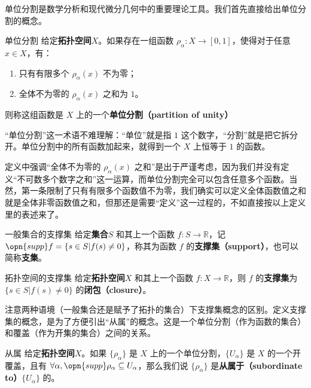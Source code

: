 

单位分割是数学分析和现代微分几何中的重要理论工具。我们首先直接给出单位分割的概念。

\begin{definition}{单位分割}
给定\textbf{拓扑空间}$X$。如果存在一组函数 $\rho_\alpha: X \to [0, 1]$，使得对于任意 $x\in X$，有：
\begin{enumerate}
\item 只有有限多个 $\rho_\alpha(x)$ 不为零；
\item 全体不为零的 $\rho_\alpha(x)$ 之和为 $1$。
\end{enumerate}
则称这组函数是 $X$ 上的一个\textbf{单位分割（partition of unity）}
\end{definition}

“单位分割”这一术语不难理解：“单位”就是指 $1$ 这个数字，“分割”就是把它拆分开。单位分割中的所有函数加起来，就得到一个 $X$ 上恒等于 $1$ 的函数。

定义中强调“全体不为零的 $\rho_\alpha(x)$ 之和”是出于严谨考虑，因为我们并没有定义“不可数多个数字之和”这一运算，而单位分割完全可以包含任意多个函数。当然，第一条限制了只有有限多个函数值不为零，我们确实可以定义全体函数值之和就是全体非零函数值之和，但那还是需要“定义”这一过程的，不如直接按以上定义里的表述来了。

\begin{definition}{一般集合的支撑集}
给定\textbf{集合}$S$ 和其上一个函数 $f:S\to\mathbb{R}$，记 $\opn{supp} f = \{s\in S| f(s)\not=0\}$，称其为函数 $f$ 的\textbf{支撑集（support）}，也可以简称\textbf{支集}。
\end{definition}

\begin{definition}{拓扑空间的支撑集}
给定\textbf{拓扑空间}$X$ 和其上一个函数 $f:X\to\mathbb{R}$，则 $f$ 的\textbf{支撑集}为 $\{s\in S| f(s)\not=0\}$ 的\textbf{闭包（closure）}。
\end{definition}

注意两种语境（一般集合还是赋予了拓扑的集合）下支撑集概念的区别。定义支撑集的概念，是为了方便引出“从属”的概念。这是一个单位分割（作为函数的集合）和覆盖（作为开集的集合）之间的关系。

\begin{definition}{从属}
给定\textbf{拓扑空间}$X$。如果 $\{\rho_\alpha\}$ 是 $X$ 上的一个单位分割，$\{U_\alpha\}$ 是 $X$ 的一个开覆盖，且有 $\forall \alpha, \opn{supp}\rho_\alpha\subseteq U_\alpha$，那么我们说 $\{\rho_\alpha\}$ 是\textbf{从属于（subordinate to）}$\{U_\alpha\}$ 的。
\end{definition}

